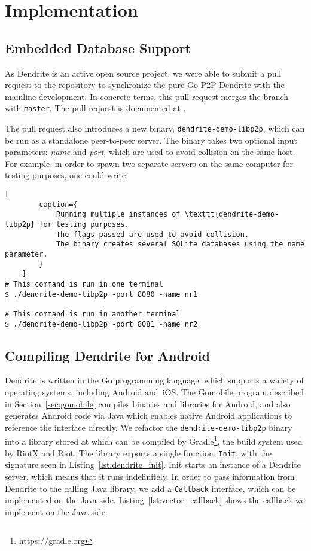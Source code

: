 \chapter{Implementation}

\section{Embedded Database Support}
As Dendrite is an active open source project, we were able to submit a pull request to the repository to synchronize the pure Go P2P Dendrite with the mainline development.
In concrete terms, this pull request merges the  branch with \texttt{master}.
The pull request is documented at .

The pull request also introduces a new binary, \texttt{dendrite-demo-libp2p}, which can be run as a standalone peer-to-peer server.
The binary takes two optional input parameters: \textit{name} and \textit{port}, which are used to avoid collision on the same host.
For example, in order to spawn two separate servers on the same computer for testing purposes, one could write:

\begin{lstfloat}
	\begin{lstlisting}[
        caption={
            Running multiple instances of \texttt{dendrite-demo-libp2p} for testing purposes.
            The flags passed are used to avoid collision.
            The binary creates several SQLite databases using the name parameter.
        }
    ]
# This command is run in one terminal
$ ./dendrite-demo-libp2p -port 8080 -name nr1

# This command is run in another terminal
$ ./dendrite-demo-libp2p -port 8081 -name nr2
\end{lstlisting}
\end{lstfloat}

\section{Compiling Dendrite for Android}
Dendrite is written in the Go programming language, which supports a variety of operating systems, including Android and~iOS\@.
The Gomobile program described in Section~\ref{sec:gomobile} compiles binaries and libraries for Android, and also generates Android code via Java which enables native Android applications to reference the interface directly.
We refactor the \texttt{dendrite-demo-libp2p} binary into a library stored at  which can be compiled by Gradle\footnote{https://gradle.org}, the build system used by RiotX and Riot.
The library exports a single function, \texttt{Init}, with the signature seen in Listing~\ref{lst:dendrite_init}.
Init starts an instance of a Dendrite server, which means that it runs indefinitely.
In order to pass information from Dendrite to the calling Java library, we add a \texttt{Callback} interface, which can be implemented on the Java side.
Listing~\ref{lst:vector_callback} shows the callback we implement on the Java side.

